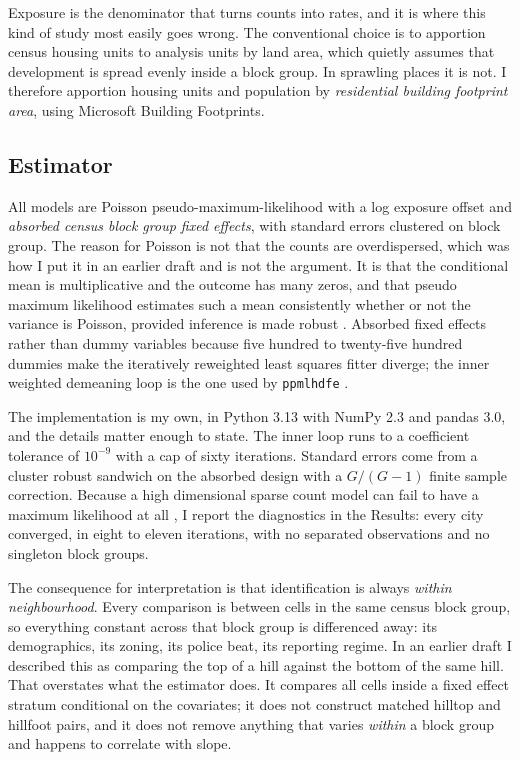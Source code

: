 \documentclass[12pt,letterpaper]{article}
\begin{document}
Exposure is the denominator that turns counts into rates, and it is where this kind
of study most easily goes wrong. The conventional choice is to apportion census
housing units to analysis units by land area, which quietly assumes that development
is spread evenly inside a block group. In sprawling places it is not. I therefore
apportion housing units and population by \emph{residential building footprint area},
using Microsoft Building Footprints.

\subsection{Estimator}

All models are Poisson pseudo-maximum-likelihood with a log exposure offset and
\emph{absorbed census block group fixed effects}, with standard errors clustered on
block group. The reason for Poisson is not that the counts are overdispersed, which
was how I put it in an earlier draft and is not the argument. It is that the
conditional mean is multiplicative and the outcome has many zeros, and that pseudo
maximum likelihood estimates such a mean consistently whether or not the variance is
Poisson, provided inference is made robust \citep{silva2006}. Absorbed fixed effects
rather than dummy variables because five hundred to twenty-five hundred dummies make
the iteratively reweighted least squares fitter diverge; the inner weighted
demeaning loop is the one used by \texttt{ppmlhdfe} \citep{correia2020}.

The implementation is my own, in Python 3.13 with NumPy 2.3 and pandas 3.0, and the
details matter enough to state. The inner loop runs to a coefficient tolerance of
$10^{-9}$ with a cap of sixty iterations. Standard errors come from a cluster robust
sandwich on the absorbed design with a $G/(G-1)$ finite sample correction. Because a
high dimensional sparse count model can fail to have a maximum likelihood at all
\citep{correia2020}, I report the diagnostics in the Results: every city converged,
in eight to eleven iterations, with no separated observations and no singleton block
groups.

The consequence for interpretation is that identification is always \emph{within
neighbourhood}. Every comparison is between cells in the same census block group, so
everything constant across that block group is differenced away: its demographics,
its zoning, its police beat, its reporting regime. In an earlier draft I described
this as comparing the top of a hill against the bottom of the same hill. That
overstates what the estimator does. It compares all cells inside a fixed effect
stratum conditional on the covariates; it does not construct matched hilltop and
hillfoot pairs, and it does not remove anything that varies \emph{within} a block
group and happens to correlate with slope.
\end{document}
